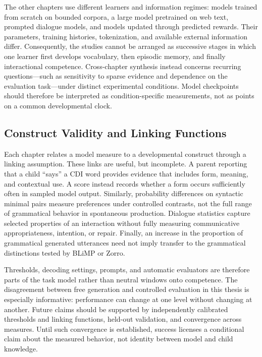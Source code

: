 The other chapters use different learners and information regimes: models trained from scratch on bounded corpora, a large model pretrained on web text, prompted dialogue models, and models updated through predicted rewards. Their parameters, training histories, tokenization, and available external information differ. Consequently, the studies cannot be arranged as successive stages in which one learner first develops vocabulary, then episodic memory, and finally interactional competence. Cross-chapter synthesis instead concerns recurring questions---such as sensitivity to sparse evidence and dependence on the evaluation task---under distinct experimental conditions. Model checkpoints should therefore be interpreted as condition-specific measurements, not as points on a common developmental clock.

\subsection{Construct Validity and Linking Functions}

Each chapter relates a model measure to a developmental construct through a linking assumption. These links are useful, but incomplete. A parent reporting that a child ``says'' a CDI word provides evidence that includes form, meaning, and contextual use. A \meCDI{} score instead records whether a form occurs sufficiently often in sampled model output. Similarly, probability differences on syntactic minimal pairs measure preferences under controlled contrasts, not the full range of grammatical behavior in spontaneous production. Dialogue statistics capture selected properties of an interaction without fully measuring communicative appropriateness, intention, or repair. Finally, an increase in the proportion of grammatical generated utterances need not imply transfer to the grammatical distinctions tested by BLiMP or Zorro.

Thresholds, decoding settings, prompts, and automatic evaluators are therefore parts of the task model rather than neutral windows onto competence. The disagreement between free generation and controlled evaluation in this thesis is especially informative: performance can change at one level without changing at another. Future claims should be supported by independently calibrated thresholds and linking functions, held-out validation, and convergence across measures. Until such convergence is established, success licenses a conditional claim about the measured behavior, not identity between model and child knowledge.


